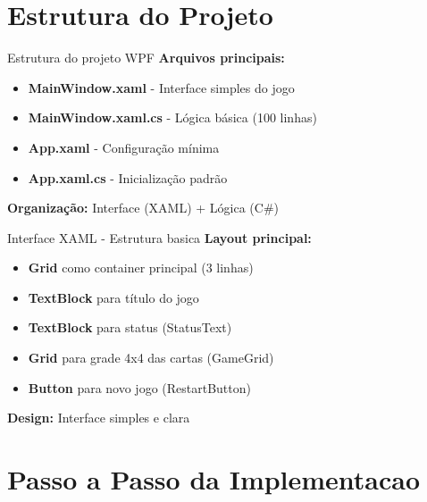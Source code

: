 \documentclass[aspectratio=169]{beamer}
\begin{document}
\section{Estrutura do Projeto}

\begin{frame}{Estrutura do projeto WPF}
\textbf{Arquivos principais:}
\begin{itemize}
    \item \textbf{MainWindow.xaml} - Interface simples do jogo
    \item \textbf{MainWindow.xaml.cs} - Lógica básica (100 linhas)
    \item \textbf{App.xaml} - Configuração mínima
    \item \textbf{App.xaml.cs} - Inicialização padrão
\end{itemize}

\textbf{Organização:} Interface (XAML) + Lógica (C\#)
\end{frame}

\begin{frame}{Interface XAML - Estrutura basica}
\textbf{Layout principal:}
\begin{itemize}
    \item \textbf{Grid} como container principal (3 linhas)
    \item \textbf{TextBlock} para título do jogo
    \item \textbf{TextBlock} para status (StatusText)
    \item \textbf{Grid} para grade 4x4 das cartas (GameGrid)
    \item \textbf{Button} para novo jogo (RestartButton)
\end{itemize}

\textbf{Design:} Interface simples e clara
\end{frame}

\section{Passo a Passo da Implementacao}
\end{document}
